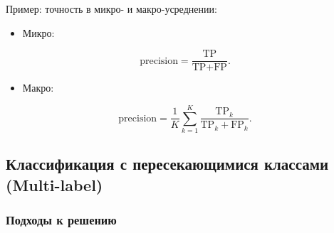 Пример: точность в микро- и макро-усреднении: 
\begin{itemize}
\item
  Микро:
\end{itemize}
\begin{equation}
\text{precision} = \frac{\text{TP}}{\text{TP} + \text{FP}}.
\end{equation}

\begin{itemize}
\tightlist
\item
  Макро:
\end{itemize}

\begin{equation}
\text{precision} = \frac{1}{K} \sum_{k=1}^K \frac{\text{TP}_k}{\text{TP}_k + \text{FP}_k}.
\end{equation}

\hypertarget{ux43aux43bux430ux441ux441ux438ux444ux438ux43aux430ux446ux438ux44f-ux441-ux43fux435ux440ux435ux441ux435ux43aux430ux44eux449ux438ux43cux438ux441ux44f-ux43aux43bux430ux441ux441ux430ux43cux438-multi-label}{%
\subsection*{Классификация с пересекающимися классами
(Multi-label)}\label{ux43aux43bux430ux441ux441ux438ux444ux438ux43aux430ux446ux438ux44f-ux441-ux43fux435ux440ux435ux441ux435ux43aux430ux44eux449ux438ux43cux438ux441ux44f-ux43aux43bux430ux441ux441ux430ux43cux438-multi-label}}

\hypertarget{ux43fux43eux434ux445ux43eux434ux44b-ux43a-ux440ux435ux448ux435ux43dux438ux44e}{%
\subsubsection*{Подходы к
решению}\label{ux43fux43eux434ux445ux43eux434ux44b-ux43a-ux440ux435ux448ux435ux43dux438ux44e}}

